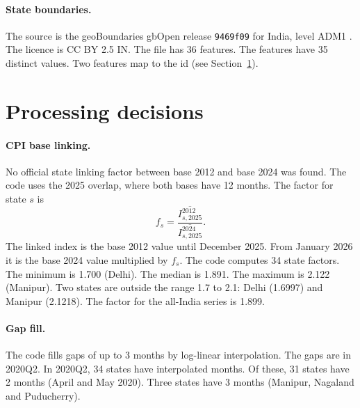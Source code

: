 \documentclass[11pt,a4paper]{article}
\begin{document}
\paragraph{State boundaries.}
The source is the geoBoundaries gbOpen release \texttt{9469f09} for India, level ADM1 \citep{geoboundaries_ind_adm1,geoboundaries_ind_adm1_data}. The licence is CC BY 2.5 IN.
The file has 36 features. The features have 35 distinct  values. Two features map to the id  (see Section~\ref{sec:decisions}).

\section{Processing decisions}\label{sec:decisions}
\paragraph{CPI base linking.}
No official state linking factor between base 2012 and base 2024 was found. The code uses the 2025 overlap, where both bases have 12 months. The factor for state $s$ is
\[
f_s = \frac{\overline{I^{2012}_{s,2025}}}{\overline{I^{2024}_{s,2025}}}.
\]
The linked index is the base 2012 value until December 2025. From January 2026 it is the base 2024 value multiplied by $f_s$.
The code computes 34 state factors. The minimum is 1.700 (Delhi). The median is 1.891. The maximum is 2.122 (Manipur). Two states are outside the range 1.7 to 2.1: Delhi (1.6997) and Manipur (2.1218).
The factor for the all-India series is 1.899.

\paragraph{Gap fill.}
The code fills gaps of up to 3 months by log-linear interpolation. The gaps are in 2020Q2.
In 2020Q2, 34 states have interpolated months. Of these, 31 states have 2 months (April and May 2020). Three states have 3 months (Manipur, Nagaland and Puducherry).
\end{document}
